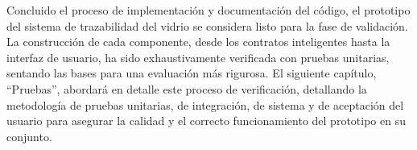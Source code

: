 Concluido el proceso de implementación y documentación del código, el prototipo del sistema de trazabilidad del vidrio se considera listo para la fase de validación. La construcción de cada componente, desde los contratos inteligentes hasta la interfaz de usuario, ha sido exhaustivamente verificada con pruebas unitarias, sentando las bases para una evaluación más rigurosa. El siguiente capítulo, ``Pruebas'', abordará en detalle este proceso de verificación, detallando la metodología de pruebas unitarias, de integración, de sistema y de aceptación del usuario para asegurar la calidad y el correcto funcionamiento del prototipo en su conjunto.
